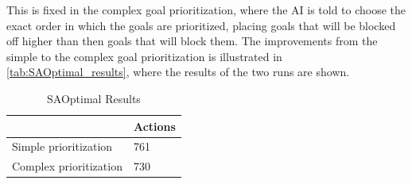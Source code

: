 This is fixed in the complex goal prioritization, where the AI is told to choose the exact order in which the goals are prioritized, placing goals that will be blocked off higher than then goals that will block them.  
The improvements from the simple to the complex goal prioritization is illustrated in \cref{tab:SAOptimal_results}, where the results of the two runs are shown.

\begin{table}[h!]
\centering
\caption{SAOptimal Results}
\label{SAOptimal_results}
\begin{tabular}{| l | l |}
\hline
                                   & Actions\\ \hline
Simple prioritization    & 761      \\ \hline
Complex prioritization & 730     \\ \hline
\end{tabular}
\end{table}

